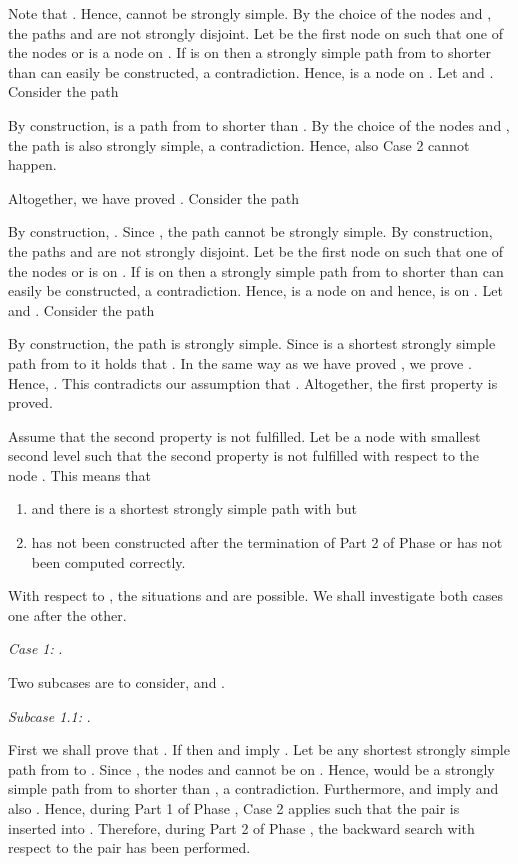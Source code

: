 \documentclass[12pt,twoside,a4paper]{article}
\begin{document}
Note that . Hence,  cannot be strongly simple. By the choice of the nodes
 and , the paths  and  are not strongly disjoint. Let
 be the first node on  such that one of the nodes  or  is a node on 
. 
If  is on  then a strongly simple path from  to  shorter than  
can easily be constructed, a contradiction. Hence,  is a node on . 
Let  and . Consider the path

By construction,  is a path from  to  shorter than .
By the choice of the nodes  and , the path  is also strongly simple, a contradiction. 
Hence, also Case 2 cannot happen.

\medskip
Altogether, we have proved . Consider the path

By construction, . Since , the path  cannot be strongly simple. By
construction, the paths  and  are not strongly disjoint. Let  be the first
node on  such that one of the nodes  or  is on . 
If  is on  then a strongly simple path from  to  shorter than  
can easily be constructed, a contradiction. Hence,  is a node on  and hence, 
is on .  Let
 and . Consider the path
 
By construction, the path  is strongly simple. Since  is a shortest strongly simple
path from  to  it holds that .
In the same way as we have proved , we prove 
 . Hence, . This contradicts our assumption 
that . 
Altogether, the first property is proved.

\medskip
Assume that the second property is not fulfilled. Let  be a node with smallest second
level such that the second property is not fulfilled with respect to the node . This means 
that
\begin{enumerate}
\item
 and there is a shortest strongly simple path 
 with  but 
\item
 has not been constructed after the termination of Part 2 of Phase  or 
 has not been computed correctly. 
\end{enumerate}
With respect to , the situations  and  are possible. We shall investigate 
both cases one after the other.

\medskip
\noindent
{\em Case 1:} .

\medskip
Two subcases are to consider,  and
.

\medskip
\noindent
{\em Subcase 1.1:} .

\medskip
First we shall prove that . 
If  then  and
 imply .
Let  be any shortest strongly simple path from  to
. Since , the nodes  and  cannot be on . 
Hence,  would be a strongly simple path from  to  shorter than 
, a contradiction. Furthermore,  and
 imply  and also
. Hence, during Part 1 of Phase , Case 2 applies such
that the pair  is inserted into . Therefore,
during Part 2 of Phase , the backward search with respect to the pair 
 has been performed.
\end{document}
